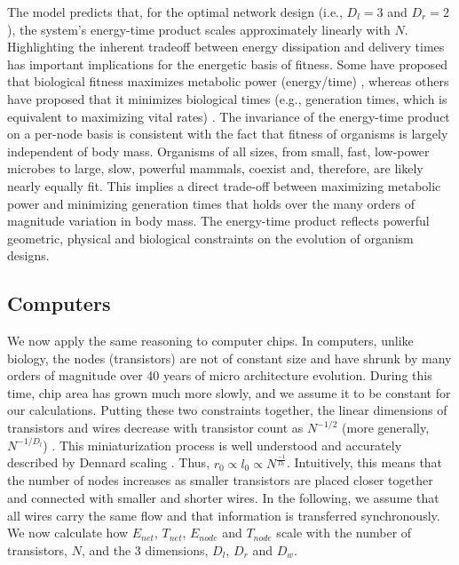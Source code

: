 \documentclass[12pt]{article}
\begin{document}
The model predicts that, for the optimal network design (i.e., $D_l=3$  and
$D_r=2$), the system's energy-time product scales approximately linearly with $N$. Highlighting the inherent tradeoff between energy dissipation and delivery times 
has important implications for the energetic basis of fitness.  Some have proposed that biological fitness
maximizes metabolic power (energy/time) \cite{lotka56, odum71}, whereas others
have proposed that it minimizes biological times (e.g., generation times, which
is equivalent to maximizing vital rates) \cite{lindstedt81, sibly91}. The
invariance of the energy-time product on a per-node basis is consistent with the fact that fitness
of organisms is largely independent of body mass.  Organisms of all sizes, from
small, fast, low-power microbes to large, slow, powerful mammals, coexist and,
therefore, are likely nearly equally fit.  This implies a direct trade-off
between maximizing metabolic power and minimizing generation times that holds
over the many orders of magnitude variation in body mass.  The energy-time
product reflects powerful geometric, physical and biological constraints on the
evolution of organism designs.


\subsection{Computers}
\label{sec:computers}

We now apply the same reasoning to computer chips. 
In computers, unlike biology, the nodes (transistors) 
are not of constant size and have shrunk by many orders of magnitude over 40
years of micro architecture evolution.  During this time, chip area has grown
much more slowly, and we assume it to be constant for our calculations.
Putting these two constraints together, the linear dimensions of transistors
and wires decrease with transistor count as $N^{-1/2}$ (more generally,
$N^{-1/D_l}$) \cite{moses08}.  This miniaturization process is well understood
and accurately described by Dennard scaling \cite{dennard74}.  
Thus, $r_0 \propto l_0 \propto N^{\frac{-1}{D_l}}$. Intuitively, this means
that the number of nodes increases as smaller transistors are placed closer
together and connected with smaller and shorter wires. In the following,
we assume that all wires carry the same flow and that information is
transferred synchronously. We now calculate how $E_{net}$, $T_{net}$,
$E_{node}$ and $T_{node}$ scale with the number of transistors, $N$, and the 3
dimensions, $D_l$, $D_r$ and $D_w$.
\end{document}
